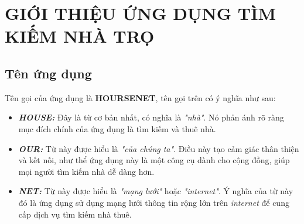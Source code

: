 \section{GIỚI THIỆU ỨNG DỤNG TÌM KIẾM NHÀ TRỌ}
\subsection{Tên ứng dụng}
Tên gọi của ứng dụng là \textbf{\color{AppGreen} HOURSENET}, tên gọi trên có ý nghĩa như sau:
\begin{itemize}
    \item \textbf{\textit{HOUSE:}} Đây là từ cơ bản nhất, có nghĩa là \textit{"nhà"}. Nó phản ánh rõ ràng mục đích chính của ứng dụng là tìm kiếm và thuê nhà.
    \item \textbf{\textit{OUR:}} Từ này được hiểu là \textit{"của chúng ta"}. Điều này tạo cảm giác thân thiện và kết nối, như thể ứng dụng này là một công cụ dành cho cộng đồng, giúp mọi người tìm kiếm nhà dễ dàng hơn.
    \item \textbf{\textit{NET:}} Từ này được hiểu là \textit{"mạng lưới"} hoặc \textit{"internet"}. Ý nghĩa của từ này đó là ứng dụng sử dụng mạng lưới thông tin rộng lớn trên \textit{internet} để cung cấp dịch vụ tìm kiếm nhà thuê.
\end{itemize}

